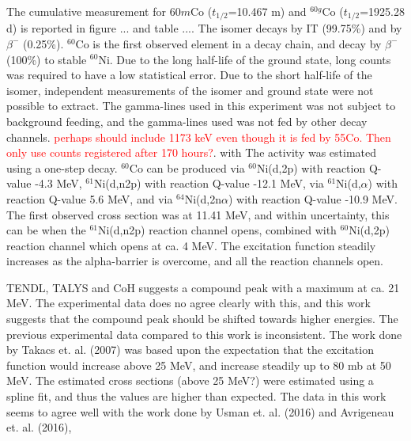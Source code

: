 \subsubsection{}
The cumulative measurement for $60m$Co ($t_{1/2}$=10.467 m) and $^{60g}$Co ($t_{1/2}$=1925.28 d) \cite{Browne2013} is reported in figure ... and table .... The isomer decays by IT (99.75\%) and by $\beta^-$ (0.25\%). $^{60}$Co is the first observed element in a decay chain, and decay by $\beta^-$ (100\%) to stable $^{60}$Ni. Due to the long half-life of the ground state, long counts was required to have a low statistical error. Due to the short half-life of the isomer, independent measurements of the isomer and ground state were not possible to extract. The gamma-lines used in this experiment was not subject to background feeding, and the gamma-lines used was not fed by other decay channels. 
\textcolor{red}{perhaps should include 1173 keV even though it is fed by 55Co. Then only use counts registered after 170 hours?}. with  The activity was estimated using a one-step decay. $^{60}$Co can be produced via $^{60}$Ni(d,2p) with reaction Q-value -4.3 MeV, $^{61}$Ni(d,n2p) with reaction Q-value -12.1 MeV, via $^{61}$Ni(d,$\alpha$) with reaction Q-value 5.6 MeV, and via $^{64}$Ni(d,2n$\alpha$) with reaction Q-value -10.9 MeV. The first observed cross section was at 11.41 MeV, and within uncertainty, this can be when the $^{61}$Ni(d,n2p) reaction channel opens, combined with $^{60}$Ni(d,2p) reaction channel which opens at ca. 4 MeV. The excitation function steadily increases as the alpha-barrier is overcome, and all the reaction channels open. 

TENDL, TALYS and CoH suggests a compound peak with a maximum at ca. 21 MeV. The experimental data does no agree clearly with this, and this work suggests that the compound peak should be shifted towards higher energies. The previous experimental data \cite{Avrigeanu2016, Usman2016, Hermanne2013, Takacs2007} compared to this work is inconsistent. The work done by Takacs et. al. (2007) was based upon the expectation that the excitation function would increase above 25 MeV, and increase steadily up to 80 mb at 50 MeV. The  estimated cross sections (above 25 MeV?) were estimated using a spline fit, and thus the values are higher than expected. The data in this work seems to agree well with the work done by Usman et. al. (2016) and Avrigeneau et. al. (2016), 





